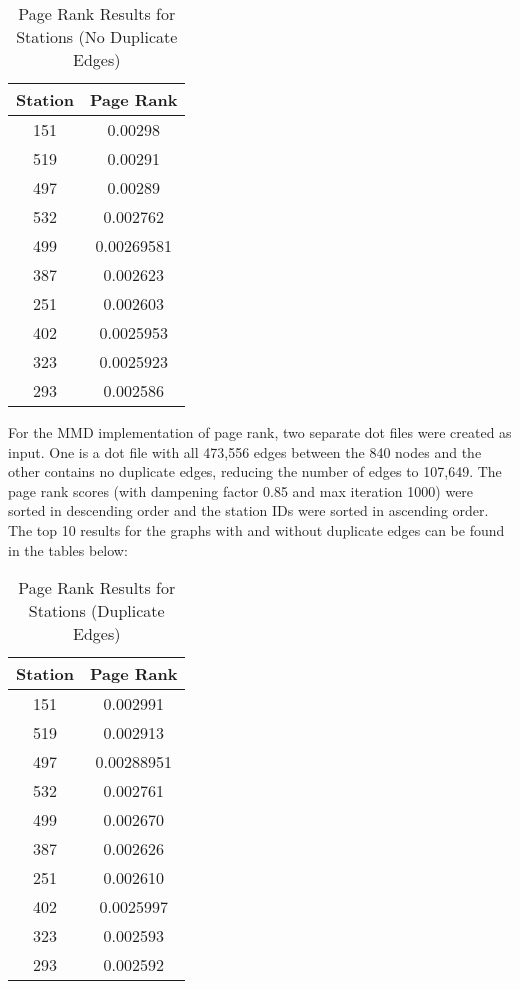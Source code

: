 \documentclass{article}
\begin{document}
 \begin{table}[h!]
\caption{Page Rank Results for Stations (No Duplicate Edges)}
\centering
 \begin{tabular}{||c c||} 
 \hline
 Station & Page Rank \\ [0.5ex] 
 \hline\hline
 151 & 0.00298\\ 
 519 & 0.00291\\
 497 & 0.00289\\ 
 532 & 0.002762\\
 499 & 0.00269581\\
 387 & 0.002623\\
 251 & 0.002603\\
 402 & 0.0025953\\
 323 & 0.0025923\\
 293 & 0.002586\\[1ex] 
 \hline
 \end{tabular}
 \end{table}
For the MMD implementation of page rank, two separate dot files were created as input. One is a dot file with all 473,556 edges between the 840 nodes and the other contains no duplicate edges, reducing the number of edges to 107,649. The page rank scores (with dampening factor 0.85 and max iteration 1000) were sorted in descending order and the station IDs were sorted in ascending order. The top 10 results for the graphs with and without duplicate edges can be found in the tables below: 

\begin{table}[h!]
\caption{Page Rank Results for Stations (Duplicate Edges)}
\centering
 \begin{tabular}{||c c||} 
 \hline
 Station & Page Rank \\ [0.5ex] 
 \hline\hline
 151 & 0.002991\\ 
 519 & 0.002913\\
 497 & 0.00288951\\ 
 532 & 0.002761\\
 499 & 0.002670\\
 387 & 0.002626\\
 251 & 0.002610\\
 402 & 0.0025997\\
 323 & 0.002593\\
 293 & 0.002592\\[1ex] 
 \hline
 \end{tabular}
 \end{table}
 
\end{document}
